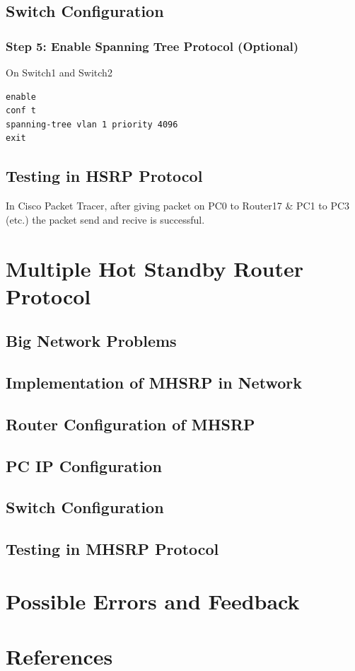 \documentclass[12pt]{report}
\begin{document}
\section{Switch Configuration}
\subsection*{Step 5: Enable Spanning Tree Protocol (Optional)}
On Switch1 and Switch2
\begin{Verbatim}[fontsize=\small, formatcom=\hackfont\color{black}, frame=single]
enable
conf t
spanning-tree vlan 1 priority 4096
exit
\end{Verbatim}

\newpage

\section{Testing in HSRP Protocol}
In Cisco Packet Tracer, after giving packet on PC0 to Router17 \& PC1 to PC3 (etc.) the packet send and recive is successful. 

\chapter{Multiple Hot Standby Router Protocol}
\section{Big Network Problems}
\section{Implementation of MHSRP in Network}
\section{Router Configuration of MHSRP}
\section{PC IP Configuration}
\section{Switch Configuration}
\section{Testing in MHSRP Protocol}
\chapter{Possible Errors and Feedback}
\chapter{References}
\end{document}
